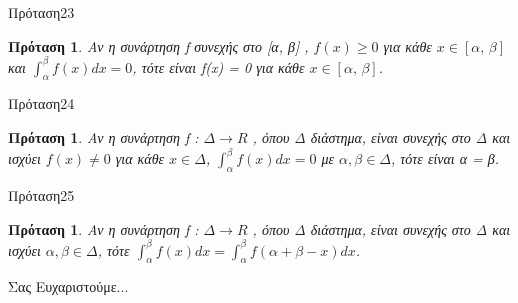 \documentclass[greek]{beamer}
\newtheorem{proposition}[theorem]{Πρόταση}
\begin{document}
\begin{frame}{Πρόταση23}
 \begin{proposition}
  \normalfont Αν η συνάρτηση f συνεχής στο [α, β] , $f(x)\ge 0$ για κάθε $x\in [\alpha ,\,\beta ]$ και $\int_{\alpha }^{\beta }{f(x)dx}=0$, τότε είναι f(x) = 0 για κάθε $x\in [\alpha ,\,\beta ]$.
 \end{proposition}
\end{frame}

\begin{frame}{Πρόταση24}
 \begin{proposition}
  \normalfont Αν η συνάρτηση f : $\Delta \to R$ , όπου Δ διάστημα, είναι συνεχής στο Δ και
  ισχύει $f(x)\ne 0$ για κάθε $x\in \Delta $, $\int_{\alpha }^{\beta }{f(x)dx}=0$ με $\alpha ,\beta \in \Delta $, τότε είναι α = β.
 \end{proposition}
\end{frame}

\begin{frame}{Πρόταση25}
 \begin{proposition}
  \normalfont Αν η συνάρτηση f : $\Delta \to R$ , όπου Δ διάστημα, είναι συνεχής στο Δ και ισχύει $\alpha ,\beta \in \Delta $, τότε $\int_{\alpha }^{\beta }{f(x)dx}=\int_{\alpha }^{\beta }{f(\alpha +\beta -x)dx}$.
 \end{proposition}
\end{frame}

\begin{frame}[plain,c]
 \begin{center}
  \Huge Σας Ευχαριστούμε...
 \end{center}
\end{frame}
\end{document}
